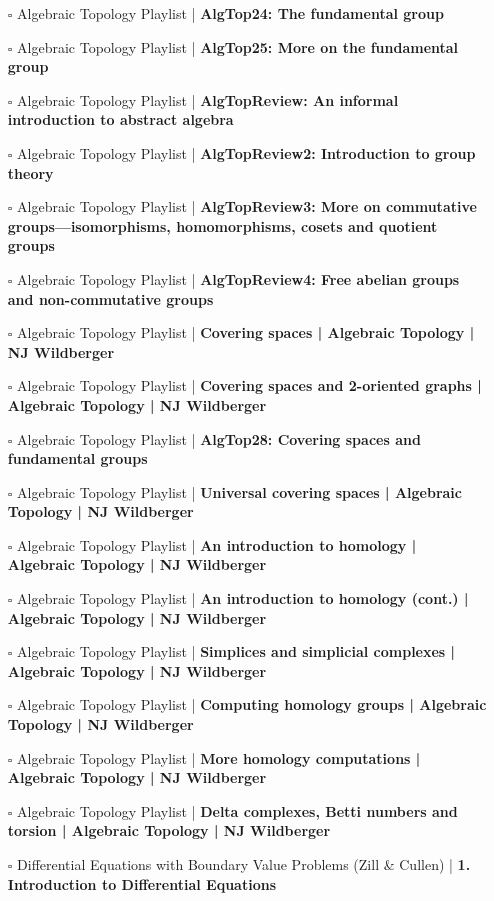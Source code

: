 \documentclass[a4, landscape, 12pt]{article}
\newcommand{\checkbox}{$\square$}%
\begin{document}
\begin{itemize}
{}
\item [\checkbox] Algebraic Topology Playlist  | \textbf{AlgTop24: The fundamental group
}
\item [\checkbox] Algebraic Topology Playlist  | \textbf{AlgTop25: More on the fundamental group
}
\item [\checkbox] Algebraic Topology Playlist  | \textbf{AlgTopReview: An informal introduction to abstract algebra
}
\item [\checkbox] Algebraic Topology Playlist  | \textbf{AlgTopReview2: Introduction to group theory
}
\item [\checkbox] Algebraic Topology Playlist  | \textbf{AlgTopReview3: More on commutative groups---isomorphisms, homomorphisms, cosets and quotient groups
}
\item [\checkbox] Algebraic Topology Playlist  | \textbf{AlgTopReview4: Free abelian groups and non-commutative groups
}
\item [\checkbox] Algebraic Topology Playlist  | \textbf{Covering spaces | Algebraic Topology | NJ Wildberger
}
\item [\checkbox] Algebraic Topology Playlist  | \textbf{Covering spaces and 2-oriented graphs | Algebraic Topology | NJ Wildberger
}
\item [\checkbox] Algebraic Topology Playlist  | \textbf{AlgTop28: Covering spaces and fundamental groups
}
\item [\checkbox] Algebraic Topology Playlist  | \textbf{Universal covering spaces | Algebraic Topology | NJ Wildberger
}
\item [\checkbox] Algebraic Topology Playlist  | \textbf{An introduction to homology | Algebraic Topology | NJ Wildberger
}
\item [\checkbox] Algebraic Topology Playlist  | \textbf{An introduction to homology (cont.) | Algebraic Topology | NJ Wildberger
}
\item [\checkbox] Algebraic Topology Playlist  | \textbf{Simplices and simplicial complexes | Algebraic Topology | NJ Wildberger
}
\item [\checkbox] Algebraic Topology Playlist  | \textbf{Computing homology groups | Algebraic Topology | NJ Wildberger
}
\item [\checkbox] Algebraic Topology Playlist  | \textbf{More homology computations | Algebraic Topology | NJ Wildberger
}
\item [\checkbox] Algebraic Topology Playlist  | \textbf{Delta complexes, Betti numbers and torsion | Algebraic Topology | NJ Wildberger
}
\item [\checkbox] Differential Equations with Boundary Value Problems (Zill & Cullen)  | \textbf{1. Introduction to Differential Equations
}
\end{itemize}
\end{document}
